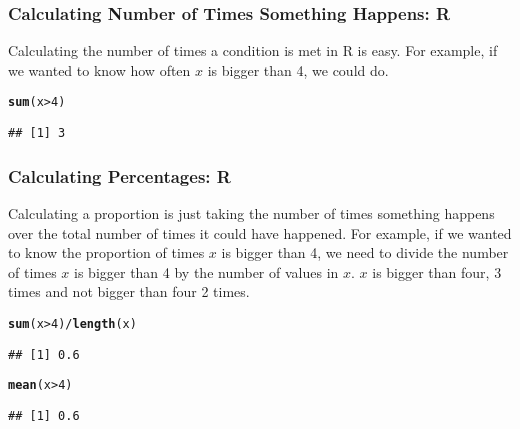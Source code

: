 \documentclass[slidestop,compress,mathserif]{beamer}\usepackage[]{graphicx}\usepackage[]{color}
\makeatletter
\newcommand{\hlnum}[1]{\textcolor[rgb]{0.686,0.059,0.569}{#1}}%
\newcommand{\hlopt}[1]{\textcolor[rgb]{0,0,0}{#1}}%
\newcommand{\hlstd}[1]{\textcolor[rgb]{0.345,0.345,0.345}{#1}}%
\newcommand{\hlkwd}[1]{\textcolor[rgb]{0.737,0.353,0.396}{\textbf{#1}}}%
\newenvironment{kframe}{%
 \def\at@end@of@kframe{}%
 \ifinner\ifhmode%
  \def\at@end@of@kframe{\end{minipage}}%
  \begin{minipage}{\columnwidth}%
 \fi\fi%
 \def\FrameCommand##1{\hskip\@totalleftmargin \hskip-\fboxsep
 \colorbox{shadecolor}{##1}\hskip-\fboxsep
     \hskip-\linewidth \hskip-\@totalleftmargin \hskip\columnwidth}%
 \MakeFramed {\advance\hsize-\width
   \@totalleftmargin\z@ \linewidth\hsize
   \@setminipage}}%
 {\par\unskip\endMakeFramed%
 \at@end@of@kframe}
\newenvironment{knitrout}{}{} %
\makeatother
\begin{document}
\begin{frame}[fragile]

\frametitle{Calculating Number of Times Something Happens: R}

Calculating the number of times a condition is met in R is easy.  For example, if we wanted to know how often $x$ is bigger than 4, we could do.  
\begin{knitrout}
\color{fgcolor}\begin{kframe}
\begin{alltt}
\hlkwd{sum}\hlstd{(x} \hlopt{>} \hlnum{4}\hlstd{)}
\end{alltt}
\begin{verbatim}
## [1] 3
\end{verbatim}
\end{kframe}
\end{knitrout}

\end{frame}

\begin{frame}[fragile]

\frametitle{Calculating Percentages: R}

Calculating a proportion is just taking the number of times something happens over the total number of times it could have happened.  For example, if we wanted to know the proportion of times $x$ is bigger than 4, we need to divide the number of times $x$ is bigger than 4 by the number of values in $x$.  $x$ is bigger than four, 3 times and not bigger than four 2 times.  
\begin{knitrout}
\color{fgcolor}\begin{kframe}
\begin{alltt}
\hlkwd{sum}\hlstd{(x} \hlopt{>} \hlnum{4}\hlstd{)}\hlopt{/}\hlkwd{length}\hlstd{(x)}
\end{alltt}
\begin{verbatim}
## [1] 0.6
\end{verbatim}
\begin{alltt}
\hlkwd{mean}\hlstd{(x} \hlopt{>} \hlnum{4}\hlstd{)}
\end{alltt}
\begin{verbatim}
## [1] 0.6
\end{verbatim}
\end{kframe}
\end{knitrout}

\end{frame}




\end{document}

